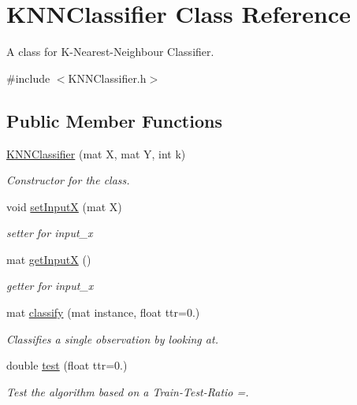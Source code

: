 \hypertarget{classKNNClassifier}{}\section{K\+N\+N\+Classifier Class Reference}
\label{classKNNClassifier}


A class for K-\/\+Nearest-\/\+Neighbour Classifier.  




{\ttfamily \#include $<$K\+N\+N\+Classifier.\+h$>$}

\subsection*{Public Member Functions}
\begin{DoxyCompactItemize}
\item 
\hyperlink{classKNNClassifier_aae3359bce60c002f41f3c585ca972d55}{K\+N\+N\+Classifier} (mat X, mat Y, int k)
\begin{DoxyCompactList}\small\item\em Constructor for the class. \end{DoxyCompactList}\item 
\mbox{\label{classKNNClassifier_abb1a82a787cc5d358ef8e2056b62f01f}} 
void \hyperlink{classKNNClassifier_abb1a82a787cc5d358ef8e2056b62f01f}{set\+InputX} (mat X)
\begin{DoxyCompactList}\small\item\em setter for input\+\_\+x \end{DoxyCompactList}\item 
\mbox{\label{classKNNClassifier_a831cb983a8ce2e88976b4e03c42f7721}} 
mat \hyperlink{classKNNClassifier_a831cb983a8ce2e88976b4e03c42f7721}{get\+InputX} ()
\begin{DoxyCompactList}\small\item\em getter for input\+\_\+x \end{DoxyCompactList}\item 
mat \hyperlink{classKNNClassifier_a447fa4c73ba8e817063de2469ddd92d9}{classify} (mat instance, float ttr=0.)
\begin{DoxyCompactList}\small\item\em Classifies a single observation by looking at. \end{DoxyCompactList}\item 
double \hyperlink{classKNNClassifier_ac270d2fa42936ae039b3ed9cde3e7ce5}{test} (float ttr=0.)
\begin{DoxyCompactList}\small\item\em Test the algorithm based on a Train-\/\+Test-\/\+Ratio =. \end{DoxyCompactList}\end{DoxyCompactItemize}
